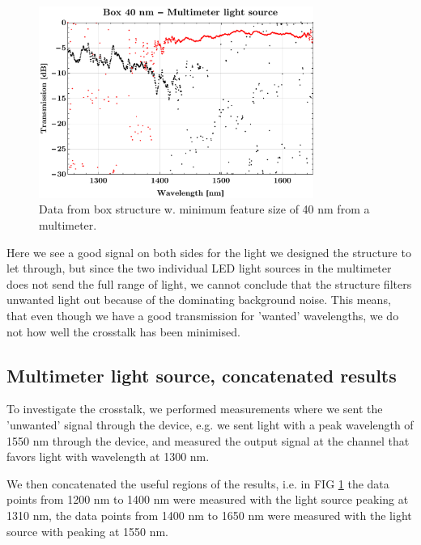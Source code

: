 \begin{figure}[H]
    \centering
    \includegraphics[width=0.8\textwidth]
    {fig/Kilde2Multimeter/box40multimeter.pdf}
    \caption{Data from box structure w. minimum feature size of 40 nm from a multimeter.}
    \label{fig:Lightsource2Rep}
\end{figure}

Here we see a good signal on both sides for the light we designed the structure to let through, but since the two individual LED light sources in the multimeter does not send the full range of light, we cannot conclude that the structure filters unwanted light out because of the dominating background noise. This means, that even though we have a good transmission for 'wanted' wavelengths, we do not how well the crosstalk has been minimised.

\subsection{Multimeter light source, concatenated results}

To investigate the crosstalk, we performed measurements where we sent the 'unwanted' signal through the device, e.g. we sent light with a peak wavelength of 1550 nm through the device, and measured the output signal at the channel that favors light with wavelength at 1300 nm.

We then concatenated the useful regions of the results, i.e. in FIG \ref{fig:Lightsource2Rep} the data points from 1200 nm to 1400 nm were measured with the light source peaking at 1310 nm, the data points from 1400 nm to 1650 nm were measured with the light source with peaking at 1550 nm.

